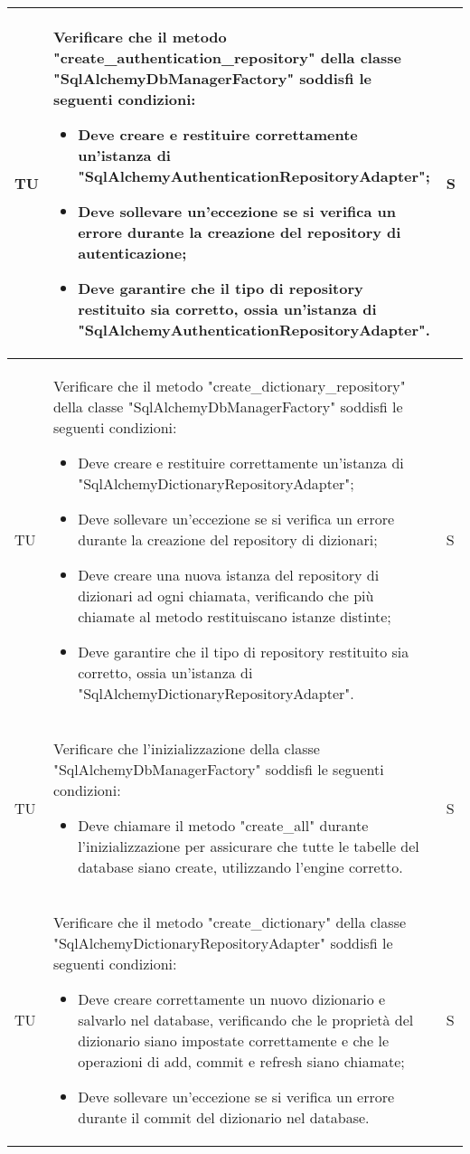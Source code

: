 \begin{adjustwidth}{-0.5cm}{-0.5cm}
\begin{longtable}{|P{1.5cm}|>{\raggedright}P{9.5cm}|>{\arraybackslash}P{1.5cm}|}
		\hline TU & Verificare che il metodo "create\_authentication\_repository" della classe "SqlAlchemyDbManagerFactory" soddisfi le seguenti condizioni:
	\begin{itemize}
		\item Deve creare e restituire correttamente un'istanza di "SqlAlchemyAuthenticationRepositoryAdapter";
		\item Deve sollevare un'eccezione se si verifica un errore durante la creazione del repository di autenticazione;
		\item Deve garantire che il tipo di repository restituito sia corretto, ossia un'istanza di "SqlAlchemyAuthenticationRepositoryAdapter".
	\end{itemize} & S \\

		\hline TU & Verificare che il metodo "create\_dictionary\_repository" della classe "SqlAlchemyDbManagerFactory" soddisfi le seguenti condizioni:
	\begin{itemize}
		\item Deve creare e restituire correttamente un'istanza di "SqlAlchemyDictionaryRepositoryAdapter";
		\item Deve sollevare un'eccezione se si verifica un errore durante la creazione del repository di dizionari;
		\item Deve creare una nuova istanza del repository di dizionari ad ogni chiamata, verificando che più chiamate al metodo restituiscano istanze distinte;
		\item Deve garantire che il tipo di repository restituito sia corretto, ossia un'istanza di "SqlAlchemyDictionaryRepositoryAdapter".
	\end{itemize} & S \\

		\hline TU & Verificare che l'inizializzazione della classe "SqlAlchemyDbManagerFactory" soddisfi le seguenti condizioni:
	\begin{itemize}
		\item Deve chiamare il metodo "create\_all" durante l'inizializzazione per assicurare che tutte le tabelle del database siano create, utilizzando l'engine corretto.
	\end{itemize} & S \\

		\hline TU & Verificare che il metodo "create\_dictionary" della classe "SqlAlchemyDictionaryRepositoryAdapter" soddisfi le seguenti condizioni:
	\begin{itemize}
		\item Deve creare correttamente un nuovo dizionario e salvarlo nel database, verificando che le proprietà del dizionario siano impostate correttamente e che le operazioni di add, commit e refresh siano chiamate;
		\item Deve sollevare un'eccezione se si verifica un errore durante il commit del dizionario nel database.
	\end{itemize} & S \\


\end{longtable}
\end{adjustwidth}
